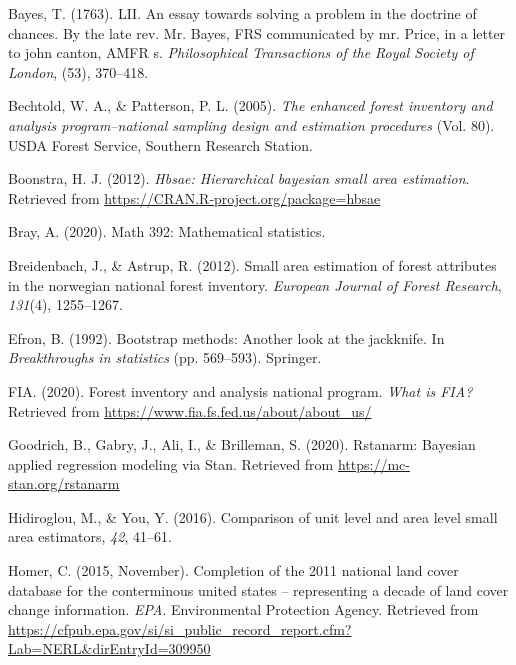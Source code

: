 \documentclass[12pt,twoside]{reedthesis}
\newlength{\cslhangindent}
\newenvironment{CSLReferences}[2] %
 {%
  \setlength{\parindent}{0pt}
  \ifodd #1 \everypar{\setlength{\hangindent}{\cslhangindent}}\ignorespaces\fi
  \ifnum #2 > 0
  \setlength{\parskip}{#2\baselineskip}
  \fi
 }%
 {}
\begin{document}
\hypertarget{refs}{}
\begin{CSLReferences}{1}{0}
\leavevmode{}%
Bayes, T. (1763). LII. An essay towards solving a problem in the doctrine of chances. By the late rev. Mr. Bayes, FRS communicated by mr. Price, in a letter to john canton, AMFR s. \emph{Philosophical Transactions of the Royal Society of London}, (53), 370--418.

\leavevmode{}%
Bechtold, W. A., \& Patterson, P. L. (2005). \emph{The enhanced forest inventory and analysis program--national sampling design and estimation procedures} (Vol. 80). USDA Forest Service, Southern Research Station.

\leavevmode{}%
Boonstra, H. J. (2012). \emph{Hbsae: Hierarchical bayesian small area estimation}. Retrieved from \url{https://CRAN.R-project.org/package=hbsae}

\leavevmode{}%
Bray, A. (2020). Math 392: Mathematical statistics.

\leavevmode{}%
Breidenbach, J., \& Astrup, R. (2012). Small area estimation of forest attributes in the norwegian national forest inventory. \emph{European Journal of Forest Research}, \emph{131}(4), 1255--1267.

\leavevmode{}%
Efron, B. (1992). Bootstrap methods: Another look at the jackknife. In \emph{Breakthroughs in statistics} (pp. 569--593). Springer.

\leavevmode{}%
FIA. (2020). Forest inventory and analysis national program. \emph{What is FIA?} Retrieved from \url{https://www.fia.fs.fed.us/about/about_us/}

\leavevmode{}%
Goodrich, B., Gabry, J., Ali, I., \& Brilleman, S. (2020). Rstanarm: {Bayesian} applied regression modeling via {Stan}. Retrieved from \url{https://mc-stan.org/rstanarm}

\leavevmode{}%
Hidiroglou, M., \& You, Y. (2016). Comparison of unit level and area level small area estimators, \emph{42}, 41--61.

\leavevmode{}%
Homer, C. (2015, November). Completion of the 2011 national land cover database for the conterminous united states -- representing a decade of land cover change information. \emph{EPA}. Environmental Protection Agency. Retrieved from \url{https://cfpub.epa.gov/si/si_public_record_report.cfm?Lab=NERL\&dirEntryId=309950}


\end{CSLReferences}
\end{document}
